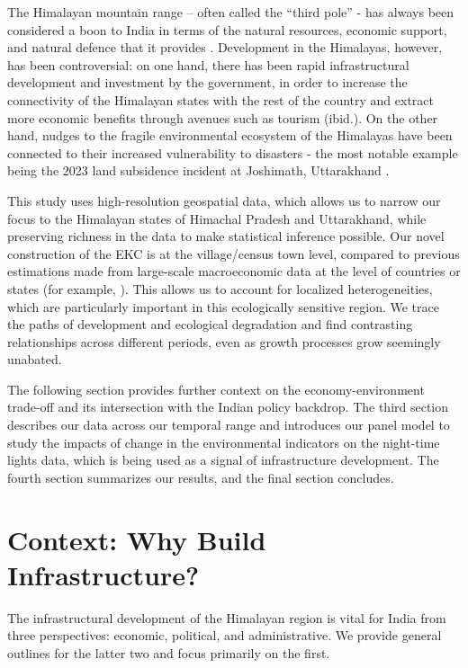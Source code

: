 \documentclass[a4paper,12pt]{article}
\begin{document}
The Himalayan mountain range – often called the “third pole” - has always been considered a boon to India in terms of the natural resources, economic support, and natural defence that it provides \parencite{dyola2024}. Development in the Himalayas, however, has been controversial: on one hand, there has been rapid infrastructural development and investment by the government, in order to increase the connectivity of the Himalayan states with the rest of the country and extract more economic benefits through avenues such as tourism (ibid.). On the other hand, nudges to the fragile environmental ecosystem of the Himalayas have been connected to their increased vulnerability to disasters - the most notable example being the 2023 land subsidence incident at Joshimath, Uttarakhand \parencite{sharma2023}.

This study uses high-resolution geospatial data, which allows us to narrow our focus to the Himalayan states of Himachal Pradesh and Uttarakhand, while preserving richness in the data to make statistical inference possible. Our novel construction of the EKC is at the village/census town level, compared to previous estimations made from large-scale macroeconomic data at the level of countries or states (for example, \cite{caviglia2009,kalka2013,list1999}). This allows us to account for localized heterogeneities, which are particularly important in this ecologically sensitive region. We trace the paths of development and ecological degradation and find contrasting relationships across different periods, even as growth processes grow seemingly unabated.

The following section provides further context on the economy-environment trade-off and its intersection with the Indian policy backdrop. The third section describes our data across our temporal range and introduces our panel model to study the impacts of change in the environmental indicators on the night-time lights data, which is being used as a signal of infrastructure development. The fourth section summarizes our results, and the final section concludes.


\section{Context: Why Build Infrastructure?}

The infrastructural development of the Himalayan region is vital for India from three perspectives: economic, political, and administrative. We provide general outlines for the latter two and focus primarily on the first.
\end{document}

